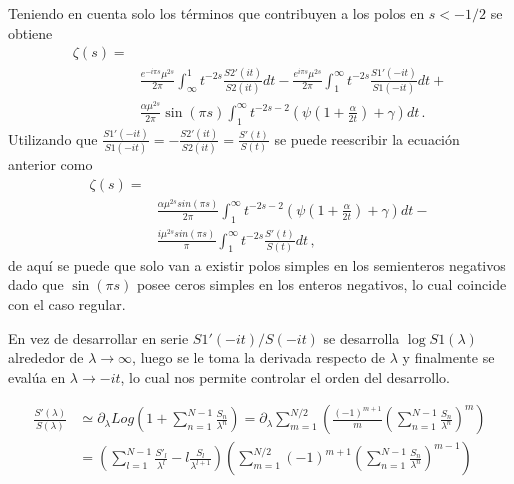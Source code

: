 Teniendo en cuenta solo los términos que contribuyen a los polos en  $s < -1/2$ se obtiene
\begin{equation}
\begin{aligned}
 \zeta  (s) =& \\[10pt]
& \frac{e ^{- i \pi s} \mu ^{2s } }{2 \pi}
\int _{\infty} ^{1} t ^{-2s } 
		\frac{S2' (it)}{S2 (it)}
		d t
	- 
\frac{e ^{i \pi s} \mu ^{2s}}{2 \pi}
\int _{1} ^{\infty} t ^{-2s } 
	\frac{S1' (-it)}{S1(-it)}
	d t +
	 \\[10pt]
	&  \frac{\alpha \mu ^{2s} }{2 \pi }	\sin ( \pi s)  \int _1 ^{\infty}
	t ^{-2s-2} \left( \psi \left( 1 + \frac{\alpha}{2 t}\right) + \gamma \right) dt 
		\, .
\end{aligned}
\end{equation}
Utilizando que  $\frac{S1' (-it)}{S1 (-i t)} = - \frac{S2 ' (i t)}{S2(it)} = \frac{S'(t)}{S(t)}  $ se puede reescribir la ecuación anterior como
\begin{equation}
\begin{aligned}
\zeta  (s) =&  \\[5pt]
&
\frac{\alpha \mu ^{2s} sin( \pi s )}{2 \pi } \int _{1} ^{\infty} 
t ^{-2s-2} \left( \psi (1 + \frac{\alpha}{2 t}) + \gamma \right) dt -\\[5pt]
&   \frac{i \mu ^{2s}  sin (\pi s)}{\pi} \int _1 ^{\infty} t ^{-2s} \frac{S'(t)}{S(t)} dt 
	\, ,
\end{aligned}
\end{equation}
de aquí se puede que solo van a existir polos simples en los semienteros negativos dado que $\sin (\pi s)$ posee ceros simples en los enteros negativos, lo cual coincide con el caso regular.

En vez de desarrollar en serie $S1 '(-i t) / S (-i t)$ se desarrolla  $\log S1 (\lambda)$ alrededor de $\lambda \rightarrow \infty$, luego se le toma la derivada respecto de $\lambda$ y finalmente se evalúa en $\lambda \rightarrow -i t$, lo cual nos permite controlar el orden del desarrollo.

\begin{equation}
\begin{aligned}
\frac{S'( \lambda)}{S( \lambda )} &\simeq 
\partial _{\lambda} Log \left(
								1 + \sum _{n=1} ^{N-1}  \frac{S _n}{\lambda ^n}
								\right) =
\partial _{\lambda} 
\sum _{m = 1} ^{N/2} 
	\left(
	\frac{(-1) ^{m+1} }{m}
	\left(
		\sum _{n=1} ^{N-1} \frac{S _n}{\lambda ^n}
		\right) ^m 
	\right)  \\[10pt]
	&=
\left(								
	\sum _{l = 1} ^{N-1} 
	\frac{S' _l}{\lambda ^l} - l \frac{S _l}{\lambda ^{l+1}}
	\right)							
\left(
	\sum _{m = 1} ^{N/2} (-1) ^{m+1} 
	\left(
			\sum _{n=1} ^{N-1} \frac{S _n}{\lambda ^n}
			\right) ^{m-1}		
	\right)
\end{aligned}	
\end{equation}



